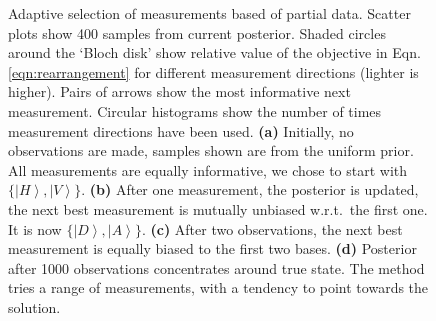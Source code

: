 \begin{figure}

	\caption{Adaptive selection of measurements based of partial data. Scatter plots show 400 samples from current posterior. Shaded circles around the `Bloch disk' show relative value of the objective in Eqn.\,\eqref{eqn:rearrangement} for different measurement directions (lighter is higher). Pairs of arrows show the most informative next measurement. Circular histograms show the number of times measurement directions have been used. \textbf{(a)}  Initially, no observations are made, samples shown are from the uniform prior. All measurements are equally informative, we chose to start with $\{\left\vert H\right\rangle,\left\vert V\right\rangle\}$. \textbf{(b)}  After one measurement, the posterior is updated, the next best measurement is mutually unbiased w.r.t.\ the first one. It is now $\{\left\vert D\right\rangle,\left\vert A\right\rangle\}$. \textbf{(c)} After two observations, the next best measurement is equally biased to the first two bases. \textbf{(d)} Posterior after 1000 observations concentrates around true state. The method tries a range of measurements, with a tendency to point towards the solution.
	\label{fig:Bloch disk}}
\end{figure}

